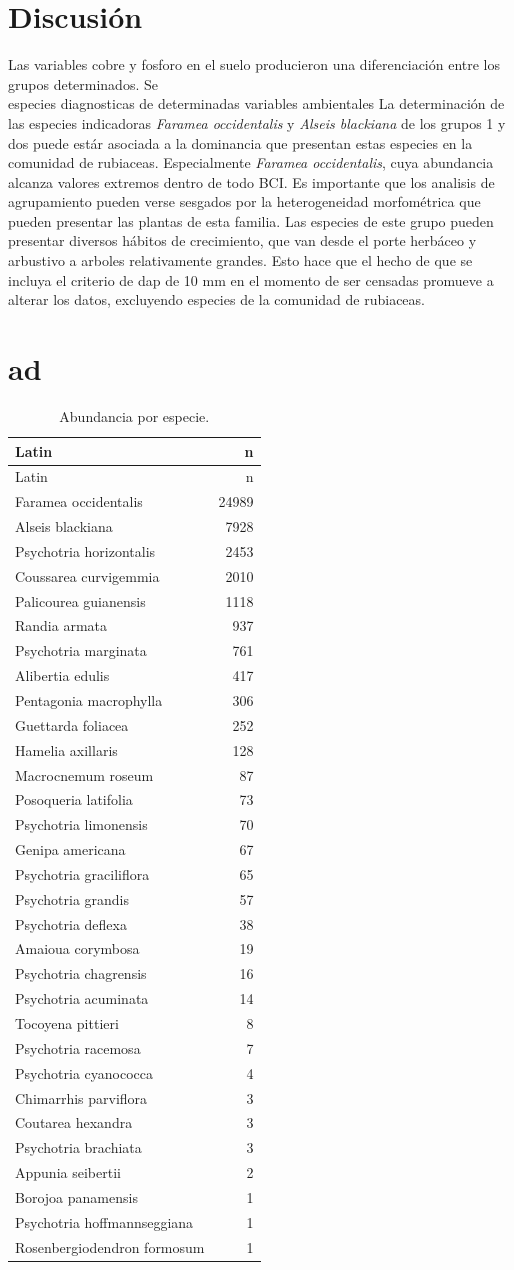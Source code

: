 \documentclass[11pt,]{article}
\begin{document}
\section{Discusión}\label{discusiuxf3n}

Las variables cobre y fosforo en el suelo producieron una diferenciación
entre los grupos determinados. Se\\
especies diagnosticas de determinadas variables ambientales La
determinación de las especies indicadoras \emph{Faramea occidentalis} y
\emph{Alseis blackiana} de los grupos 1 y dos puede estár asociada a la
dominancia que presentan estas especies en la comunidad de rubiaceas.
Especialmente \emph{Faramea occidentalis}, cuya abundancia alcanza
valores extremos dentro de todo BCI. Es importante que los analisis de
agrupamiento pueden verse sesgados por la heterogeneidad morfométrica
que pueden presentar las plantas de esta familia. Las especies de este
grupo pueden presentar diversos hábitos de crecimiento, que van desde el
porte herbáceo y arbustivo a arboles relativamente grandes. Esto hace
que el hecho de que se incluya el criterio de dap de 10 mm en el momento
de ser censadas promueve a alterar los datos, excluyendo especies de la
comunidad de rubiaceas.

\section{ad}\label{ad}

\begin{longtable}[]{@{}lr@{}}
\caption{\label{tab:abun_sp}Abundancia por especie.}\tabularnewline
\toprule
Latin & n\tabularnewline
\midrule
\endfirsthead
\toprule
Latin & n\tabularnewline
\midrule
\endhead
Faramea occidentalis & 24989\tabularnewline
Alseis blackiana & 7928\tabularnewline
Psychotria horizontalis & 2453\tabularnewline
Coussarea curvigemmia & 2010\tabularnewline
Palicourea guianensis & 1118\tabularnewline
Randia armata & 937\tabularnewline
Psychotria marginata & 761\tabularnewline
Alibertia edulis & 417\tabularnewline
Pentagonia macrophylla & 306\tabularnewline
Guettarda foliacea & 252\tabularnewline
Hamelia axillaris & 128\tabularnewline
Macrocnemum roseum & 87\tabularnewline
Posoqueria latifolia & 73\tabularnewline
Psychotria limonensis & 70\tabularnewline
Genipa americana & 67\tabularnewline
Psychotria graciliflora & 65\tabularnewline
Psychotria grandis & 57\tabularnewline
Psychotria deflexa & 38\tabularnewline
Amaioua corymbosa & 19\tabularnewline
Psychotria chagrensis & 16\tabularnewline
Psychotria acuminata & 14\tabularnewline
Tocoyena pittieri & 8\tabularnewline
Psychotria racemosa & 7\tabularnewline
Psychotria cyanococca & 4\tabularnewline
Chimarrhis parviflora & 3\tabularnewline
Coutarea hexandra & 3\tabularnewline
Psychotria brachiata & 3\tabularnewline
Appunia seibertii & 2\tabularnewline
Borojoa panamensis & 1\tabularnewline
Psychotria hoffmannseggiana & 1\tabularnewline
Rosenbergiodendron formosum & 1\tabularnewline
\bottomrule
\end{longtable}
\end{document}
